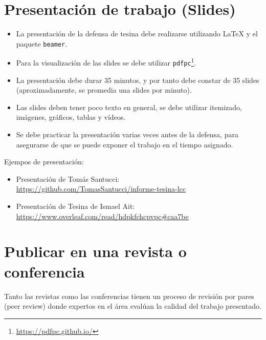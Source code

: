 \documentclass[a4paper,	11pt]{article}
\begin{document}
\section{Presentación de trabajo (Slides)}
\label{sec:slides}
\begin{itemize}
    \item La presentación de la defensa de tesina debe realizarse utilizando {\LaTeX} y el paquete \lstinline{beamer}.
    \item Para la visualización de las slides se debe utilizar \lstinline{pdfpc}\footnote{\url{https://pdfpc.github.io/}}.
    \item La presentación debe durar 35 minutos, y por tanto debe constar de 35 slides (aproximadamente, se promedia una slides por minuto).
    \item Las slides deben tener poco texto en general, se debe utilizar itemizado, imágenes, gráficos, tablas y vídeos.
    \item Se debe practicar la presentación varias veces antes de la defensa, para asegurarse de que se puede exponer el trabajo en el tiempo asignado.
\end{itemize}

Ejempos de presentación:
\begin{itemize}
    \item Presentación de Tomás Santucci: \url{https://github.com/TomasSantucci/informe-tesina-lcc}
    \item Presentación de Tesina de Ismael Ait: \url{https://www.overleaf.com/read/hdpkfchcpvpc#caa7be}
\end{itemize}

\section{Publicar en una revista o conferencia}

Tanto las revistas como las conferencias tienen un proceso de revisión por pares (peer review) donde expertos en el área evalúan la calidad del trabajo presentado.
\end{document}
